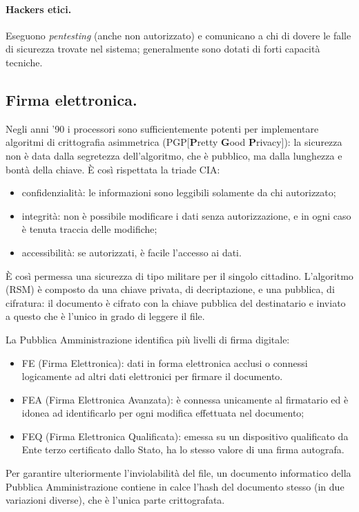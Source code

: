 \documentclass[a4page, 11pt, twocolumn]{article}
\begin{document}
\paragraph{Hackers etici.} Eseguono \textit{pentesting} (anche non autorizzato) e comunicano a chi di dovere le falle di sicurezza trovate nel sistema; generalmente sono dotati di forti capacità tecniche.

\subsection{Firma elettronica.}
Negli anni '90 i processori sono sufficientemente potenti per implementare algoritmi di crittografia asimmetrica (PGP[\textbf{P}retty \textbf{G}ood\textbf{ P}rivacy]): la sicurezza non è data dalla segretezza dell'algoritmo, che è pubblico, ma dalla lunghezza e bontà della chiave.
È così rispettata la triade CIA:
\begin{itemize}
\item confidenzialità: le informazioni sono leggibili solamente da chi autorizzato;
\item integrità: non è possibile modificare i dati senza autorizzazione, e in ogni caso è tenuta traccia delle modifiche;
\item accessibilità: se autorizzati, è facile l'accesso ai dati.
\end{itemize}
È così permessa una sicurezza di tipo militare per il singolo cittadino.
L'algoritmo (RSM) è composto da una chiave privata, di decriptazione, e una pubblica, di cifratura: il documento è cifrato con la chiave pubblica del destinatario e inviato a questo che è l'unico in grado di leggere il file.

La Pubblica Amministrazione identifica più livelli di firma digitale:
\begin{itemize}
\item FE (Firma Elettronica): dati in forma elettronica acclusi o connessi logicamente ad altri dati elettronici per firmare il documento.
\item FEA (Firma Elettronica Avanzata): è connessa unicamente al firmatario ed è idonea ad identificarlo per ogni modifica effettuata nel documento;
\item FEQ (Firma Elettronica Qualificata): emessa su un dispositivo qualificato da Ente terzo certificato dallo Stato, ha lo stesso valore di una firma autografa.
\end{itemize}
Per garantire ulteriormente l'inviolabilità del file, un documento informatico della Pubblica Amministrazione contiene in calce l'hash del documento stesso (in due variazioni diverse), che è l'unica parte crittografata.
\end{document}
